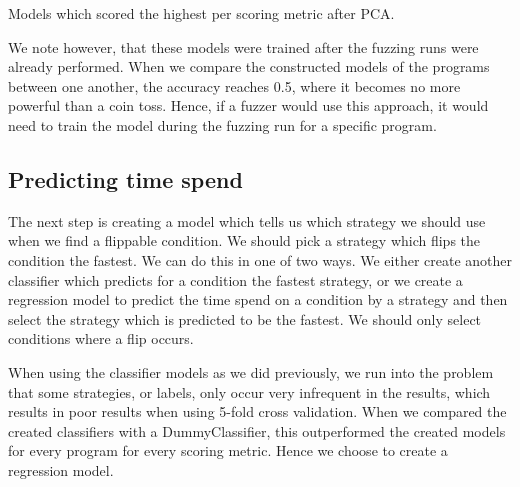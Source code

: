 \begin{table}[H]
\centering

\caption{Models which scored the highest per scoring metric after PCA.}\label{tab:classifiers-result-pca}
\end{table}
We note however, that these models were trained after the fuzzing runs were already performed. When we compare the constructed models of the programs between one another, the accuracy reaches 0.5, where it becomes no more powerful than a coin toss. Hence, if a fuzzer would use this approach, it would need to train the model during the fuzzing run for a specific program.

\subsection{Predicting time spend}
The next step is creating a model which tells us which strategy we should use when we find a flippable condition. We should pick a strategy which flips the condition the fastest. We can do this in one of two ways. We either create another classifier which predicts for a condition the fastest strategy, or we create a regression model to predict the time spend on a condition by a strategy and then select the strategy which is predicted to be the fastest. We should only select conditions where a flip occurs.

When using the classifier models as we did previously, we run into the problem that some strategies, or labels, only occur very infrequent in the results, which results in poor results when using 5-fold cross validation. When we compared the created classifiers with a DummyClassifier, this outperformed the created models for every program for every scoring metric. Hence we choose to create a regression model.

